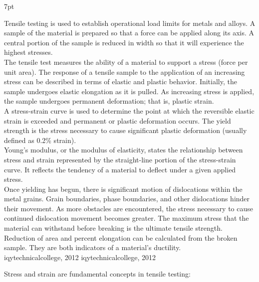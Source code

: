 \documentclass{article}
\newcommand{\formalsource}{} %
\newenvironment{formal}[1][]{%
    \renewcommand{\formalsource}{#1}%
    \def\FrameCommand{%
        \hspace{1pt}%
        {\color{darkblue}\vrule width 2pt}%
        {\color{formalshade}\vrule width 4pt}%
        \colorbox{formalshade}%
    }%
    \MakeFramed{\advance\hsize-\width\FrameRestore}%
    \noindent\hspace{-4.55pt}%
    \begin{adjustwidth}{}{7pt}%
        \vspace{2pt}%
    }%
    {%
        \vspace{4pt}%
        \ifx\formalsource\empty %
        \else
        \hfill{\footnotesize{\formalsource}}%
        \fi
    \end{adjustwidth}\endMakeFramed%
}
\begin{document}
    \begin{formal}[iqytechnicalcollege, 2012]
        Tensile testing is used to establish operational load limits for metals and alloys. A sample of the material is prepared so that a force can be applied along its axis. A central portion of the sample is reduced in width so that it will experience the highest stresses.\\[8pt]
        The tensile test measures the ability of a material to support a stress (force per unit area). The response of a tensile sample to the application of an increasing stress can be described in terms of elastic and plastic behavior. Initially, the sample undergoes elastic elongation as it is pulled. As increasing stress is applied, the sample undergoes permanent deformation; that is, plastic strain.\\[8pt]
        A stress-strain curve is used to determine the point at which the reversible elastic strain is exceeded and permanent or plastic deformation occurs. The yield strength is the stress necessary to cause significant plastic deformation (usually defined as 0.2\% strain).\\[8pt]
        Young’s modulus, or the modulus of elasticity, states the relationship between stress and strain represented by the straight-line portion of the stress-strain curve. It reflects the tendency of a material to deflect under a given applied stress.\\[8pt]
        Once yielding has begun, there is significant motion of dislocations within the metal grains. Grain boundaries, phase boundaries, and other dislocations hinder their movement. As more obstacles are encountered, the stress necessary to cause continued dislocation movement becomes greater. The maximum stress that the material can withstand before breaking is the ultimate tensile strength.\\[8pt]
        Reduction of area and percent elongation can be calculated from the broken sample. They are both indicators of a material’s ductility.\\
        \vspace{0.4pt}
    \end{formal}

     Stress and strain are fundamental concepts in tensile testing:\\[8pt]
\end{document}
